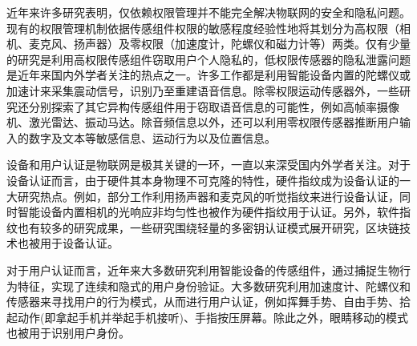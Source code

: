近年来许多研究表明，仅依赖权限管理并不能完全解决物联网的安全和隐私问题。现有的权限管理机制依据传感组件权限的敏感程度经验性地将其划分为高权限（相机、麦克风、扬声器）及零权限（加速度计，陀螺仪和磁力计等）两类。仅有少量的研究是利用高权限传感组件窃取用户个人隐私的\cite{yu2016writinghacker,song2016my,yu2019indirect,schlegel2011soundcomber,guri2017speake}，低权限传感器的隐私泄露问题是近年来国内外学者关注的热点之一。许多工作都是利用智能设备内置的陀螺仪或加速计来采集震动信号，识别乃至重建语音信息\cite{michalevsky2014gyrophone,zhang2015accelword,feng2017continuous,anand2018speechless,Ba2020Learning}。除零权限运动传感器外，一些研究还分别探索了其它异构传感组件用于窃取语音信息的可能性，例如高帧率摄像机\cite{davis2014visual}、激光雷达\cite{sami2020spying}、振动马达\cite{2016Listening}。除音频信息以外，还可以利用零权限传感器推断用户输入的数字及文本等敏感信息\cite{Xu2012Taplogger,Miluzzo2012Tapprints,Owusu2012Accessory,Cai2011TouchLogger}、运动行为\cite{kwapisz2011activity,shoaib2013towards}以及位置信息\cite{han2012accomplice}。

设备和用户认证是物联网是极其关键的一环，一直以来深受国内外学者关注。对于设备认证而言，由于硬件其本身物理不可克隆的特性，硬件指纹成为设备认证的一大研究热点。例如，部分工作利用扬声器和麦克风的听觉指纹来进行设备认证\cite{Das2014Do,Zhou2014Acoustic,Chen2015Wireless}，同时智能设备内置相机的光响应非均匀性也被作为硬件指纹用于认证\cite{Ba2018ABC}。另外，软件指纹也有较多的研究成果，一些研究围绕轻量的多密钥认证模式展开研究\cite{Hammi2020A,Shah2018Authentication}，区块链技术也被用于设备认证\cite{Li2018A}。

对于用户认证而言，近年来大多数研究利用智能设备的传感组件，通过捕捉生物行为特征，实现了连续和隐式的用户身份验证。大多数研究利用加速度计、陀螺仪和传感器来寻找用户的行为模式，从而进行用户认证，例如挥舞手势\cite{Hong2015Waving}、自由手势\cite{Meidan2017Detection}、拾起动作(即拿起手机并举起手机接听)\cite{Francois2010Machine}、手指按压屏幕\cite{Liu2017Vibwrite}。除此之外，眼睛移动的模式也被用于识别用户身份\cite{Zhang2018VR,Song2016Phone}。